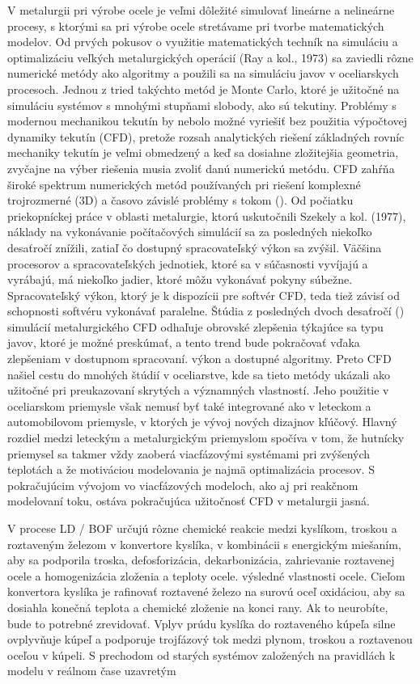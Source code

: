 \documentclass[]{tukediphc}
\begin{document}
V metalurgii pri výrobe ocele je veľmi dôležité simulovať lineárne a nelineárne procesy, s ktorými sa pri výrobe ocele stretávame pri tvorbe matematických modelov. Od prvých pokusov o využitie matematických techník na simuláciu a optimalizáciu veľkých metalurgických operácií (Ray a kol., 1973) sa zaviedli rôzne numerické metódy ako algoritmy a použili sa na simuláciu javov v oceliarskych procesoch. Jednou z tried takýchto metód je Monte Carlo, ktoré je užitočné na simuláciu systémov s mnohými stupňami slobody, ako sú tekutiny.
Problémy s modernou mechanikou tekutín by nebolo možné vyriešiť bez použitia výpočtovej dynamiky tekutín (CFD), pretože rozsah analytických riešení základných rovníc mechaniky tekutín je veľmi obmedzený a keď sa dosiahne zložitejšia geometria, zvyčajne na výber riešenia musia zvoliť danú numerickú metódu. CFD zahŕňa široké spektrum numerických metód používaných pri riešení komplexné trojrozmerné (3D) a časovo závislé problémy s tokom (\citep{RAPP20173}). Od počiatku priekopníckej práce v oblasti metalurgie, ktorú uskutočnili Szekely a kol. (1977), náklady na vykonávanie počítačových simulácií sa za posledných niekoľko desaťročí znížili, zatiaľ čo dostupný spracovateľský výkon sa zvýšil. Väčšina procesorov a spracovateľských jednotiek, ktoré sa v súčasnosti vyvíjajú a vyrábajú, má niekoľko jadier, ktoré môžu vykonávať pokyny súbežne. Spracovateľský výkon, ktorý je k dispozícii pre softvér CFD, teda tiež závisí od schopnosti softvéru vykonávať paralelne. Štúdia z posledných dvoch desaťročí (\citep{Ersson2018}) simulácií metalurgického CFD odhaľuje obrovské zlepšenia týkajúce sa typu javov, ktoré je možné preskúmať, a tento trend bude pokračovať vďaka zlepšeniam v dostupnom spracovaní. výkon a dostupné algoritmy. Preto CFD našiel cestu do mnohých štúdií v oceliarstve, kde sa tieto metódy ukázali ako užitočné pri preukazovaní skrytých a významných vlastností. Jeho použitie v oceliarskom priemysle však nemusí byť také integrované ako v leteckom a automobilovom priemysle, v ktorých je vývoj nových dizajnov kľúčový. Hlavný rozdiel medzi leteckým a metalurgickým priemyslom spočíva v tom, že hutnícky priemysel sa takmer vždy zaoberá viacfázovými systémami pri zvýšených teplotách a že motiváciou modelovania je najmä optimalizácia procesov. S pokračujúcim vývojom vo viacfázových modeloch, ako aj pri reakčnom modelovaní toku, ostáva pokračujúca užitočnosť CFD v metalurgii jasná.

V procese LD / BOF určujú rôzne chemické reakcie medzi kyslíkom, troskou a roztaveným železom v konvertore kyslíka, v kombinácii s energickým miešaním, aby sa podporila troska, defosforizácia, dekarbonizácia, zahrievanie roztavenej ocele a homogenizácia zloženia a teploty ocele. výsledné vlastnosti ocele. Cieľom konvertora kyslíka je rafinovať roztavené železo na surovú oceľ oxidáciou, aby sa dosiahla konečná teplota a chemické zloženie na konci rany. Ak to neurobíte, bude to potrebné zrevidovať. Vplyv prúdu kyslíka do roztaveného kúpeľa silne ovplyvňuje kúpeľ a podporuje trojfázový tok medzi plynom, troskou a roztavenou oceľou v kúpeli. S prechodom od starých systémov založených na pravidlách k modelu v reálnom čase uzavretým
\end{document}
